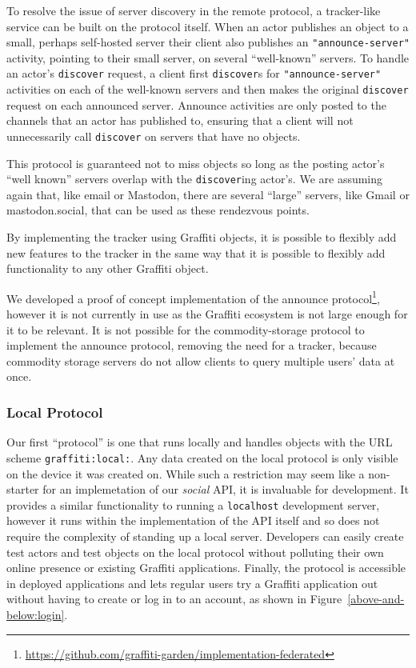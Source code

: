 To resolve the issue of server discovery in the remote protocol,
a tracker-like service can be built on the protocol itself.
When an actor publishes an object to a small, perhaps self-hosted
server their client also publishes an \texttt{"announce-server"}
activity, pointing to their small server, on several ``well-known'' servers.
To handle an actor's \texttt{discover} request, a client first \texttt{discover}s
for \texttt{"announce-server"} activities on each of the well-known
servers and then makes the original \texttt{discover} request on each
announced server.
Announce activities are only posted to the channels
that an actor has published to, ensuring that a client
will not unnecessarily call \texttt{discover} on servers
that have no objects.

This protocol is guaranteed not to miss objects so long as
the posting actor's ``well known'' servers overlap with the
\texttt{discover}ing actor's.
We are assuming again that, like email or Mastodon, there are several
``large'' servers, like Gmail or mastodon.social, that can be used as these
rendezvous points.

By implementing the tracker using Graffiti objects,
it is possible to flexibly add new features to the tracker
in the same way that it is possible to flexibly add
functionality to any other Graffiti object.

We developed a proof of concept implementation of the announce protocol\footnote{
    \url{https://github.com/graffiti-garden/implementation-federated}
},
however it is not currently in use as the Graffiti ecosystem is not
large enough for it to be relevant.
It is not possible for the commodity-storage protocol to implement
the announce protocol, removing the need for a tracker,
because commodity storage servers do not allow clients to
query multiple users' data at once.

\subsubsection{Local Protocol}

Our first ``protocol'' is one that runs locally
and handles objects with the URL scheme \texttt{graffiti:local:}.
Any data created on the local protocol is only visible on the device
it was created on.
While such a restriction may seem like a non-starter for an implemetation
of our \emph{social} API, it is invaluable for development.
It provides a similar functionality to running a \texttt{localhost} development server,
however it runs within the implementation of the API itself and so
does not require the complexity of standing up a local server.
Developers can easily create test actors and test objects on the local protocol
without polluting their own online presence or existing Graffiti applications.
Finally, the protocol is accessible in deployed applications
and lets regular users try a Graffiti application out without
having to create or log in to an account, as shown in
Figure~\ref{above-and-below:login}.

